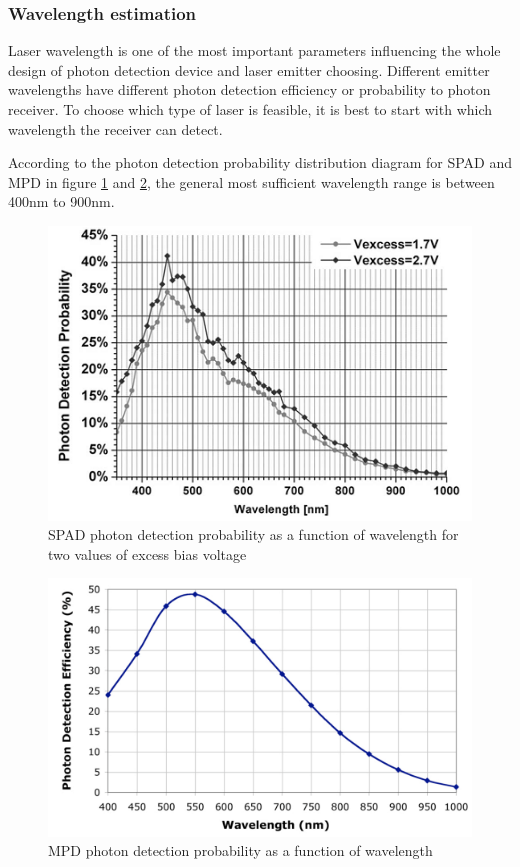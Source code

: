\subsubsection{Wavelength estimation}
\label{introReceiver}
Laser wavelength is one of the most important parameters influencing the whole design of photon detection device and \acs{laser} emitter choosing. Different emitter wavelengths have different photon detection efficiency or probability to photon receiver. To choose which type of \acs{laser} is feasible, it is best to start with which wavelength the receiver can detect.

According to the photon detection probability distribution diagram for \acs{SPAD} and \acs{MPD} in figure \ref{fig:SPAD_efficiency} and \ref{fig:MPD_efficiency}, the general most sufficient wavelength range is between 400nm to 900nm. 

\begin{figure}
\centering
\includegraphics[scale=1]{chapters/img/SPAD_efficiency.png}
\caption{\acs{SPAD} photon detection probability as a function of wavelength for two values of excess bias voltage}
\label{fig:SPAD_efficiency}
\end{figure}

\begin{figure}
\centering
\includegraphics[scale=1]{chapters/img/MPD_efficiency.png}
\caption{\acs{MPD} photon detection probability as a function of wavelength}
\label{fig:MPD_efficiency}
\end{figure}


